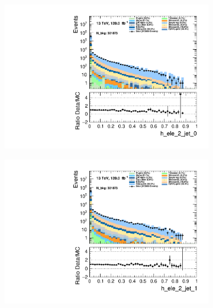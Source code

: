 \begin{figure}
\begin{subfigure}{.49\textwidth}
        \includegraphics[width=\textwidth]{Figures/MC_Data_comp/h_ele_2_jet_0.pdf}
        \caption{ }
        \label{fig:fep}
    \end{subfigure}
    \hfill
    \begin{subfigure}{.49\textwidth}
        \includegraphics[width=\textwidth]{Figures/MC_Data_comp/h_ele_2_jet_1.pdf}
        \caption{ }
        \label{fig:fe}
    \end{subfigure}
    \hfill       
    \caption{}
    \label{fig:t}
\end{figure}

